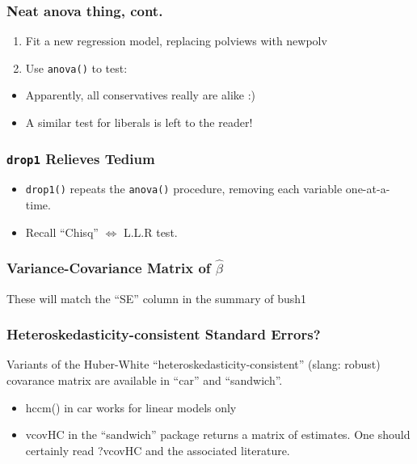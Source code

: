 \documentclass[10pt,english]{beamer}
\begin{document}
\begin{frame}[containsverbatim]
  \frametitle{Neat anova thing, cont.}

  \begin{enumerate}
  \item Fit a new regression model, replacing polviews with newpolv



 \item Use \texttt{anova()} to test:


\end{enumerate}
\begin{itemize}
\item Apparently, all conservatives really are alike :)
\item A similar test for liberals is left to the reader!
\end{itemize}
\end{frame}




\begin{frame}[containsverbatim]
  \frametitle{\texttt{drop1} Relieves Tedium}

  \begin{itemize}
  \item \texttt{drop1()} repeats the \texttt{anova()} procedure,
    removing each variable one-at-a-time.



   \item Recall ``Chisq'' $\Leftrightarrow$ L.L.R test.
   \end{itemize}
 \end{frame}



\begin{frame}
  \frametitle{Variance-Covariance Matrix of $\hat{\beta}$}


These will match the ``SE'' column in the summary of bush1

\end{frame}



\begin{frame}[containsverbatim]
  \frametitle{Heteroskedasticity-consistent Standard Errors?}

  Variants of the
  Huber-White ``heteroskedasticity-consistent'' (slang: robust)
  covarance matrix are available in ``car'' and ``sandwich''.

  \begin{itemize}

    \item  hccm() in car works for linear models only

    \item vcovHC in the ``sandwich'' package returns a matrix of
      estimates. One should certainly read ?vcovHC and the associated literature.


\end{itemize}
\end{frame}
\end{document}
